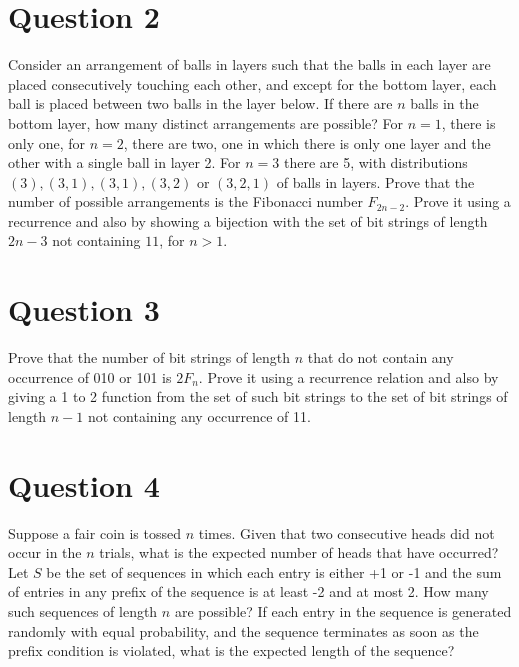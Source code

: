 \documentclass[12pt]{report}
\begin{document}
\section*{Question 2}
Consider an arrangement of balls in layers such that the balls in each layer are placed consecutively touching each other, and except for the bottom layer, each ball is placed between two balls in the layer below. If there are $n$ balls in the bottom layer, how many distinct arrangements are possible? For $n = 1$, there is only one, for $n = 2$, there are two, one in which there is only one layer and the other with a single ball in layer 2. For $n = 3$ there are 5, with distributions $(3), (3, 1), (3, 1), (3, 2)$ or $(3, 2, 1)$ of balls in layers. Prove
that the number of possible arrangements is the Fibonacci number $F_{2n - 2}$. Prove it using a
recurrence and also by showing a bijection with the set of bit strings of length $2n - 3$ not containing $11$, for $n > 1$.
\section*{Question 3}
Prove that the number of bit strings of length $n$ that do not contain any occurrence of 010 or 101 is $2F_{n}$. Prove it using a recurrence relation and also by giving a 1 to 2 function from the set of such bit strings to the set of bit strings of length $n - 1$ not containing any occurrence of 11. 
\section*{Question 4}
Suppose a fair coin is tossed $n$ times. Given that two consecutive heads did not occur in the $n$ trials, what is the expected number of heads that have occurred? Let $S$ be the set of sequences in which each entry is either +1 or -1 and the sum of entries in any prefix of the sequence is at least -2 and at most 2. How many such sequences of length $n$ are possible? If each entry in the sequence is generated randomly with equal probability, and the sequence terminates as soon as the prefix condition is violated, what is the expected length of the sequence?
\end{document}
